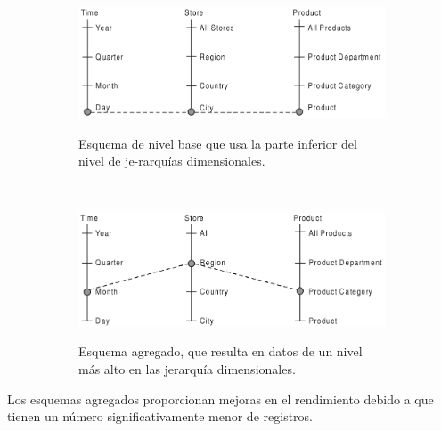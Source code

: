 \documentclass{fancyslides}
\begin{document}
\begin{frame}
\misc
{
\begin{figure}
        \centering
        \begin{subfigure}[b]{0.5\textwidth}
                \includegraphics[width=\textwidth]{ej1_agregados}

                Esquema de nivel base que usa la parte inferior del nivel de je-rarquías dimensionales.
        \end{subfigure}%
        ~ \quad
        \begin{subfigure}[b]{0.5\textwidth}
                \includegraphics[width=\textwidth]{ej2_agregados}
                
                Esquema agregado, que resulta en datos de un nivel más alto en las jerarquía dimensionales.
        \end{subfigure}
\end{figure}

Los esquemas agregados proporcionan mejoras en el rendimiento debido a que tienen un número significativamente menor de registros.

}
\end{frame}
\end{document}
